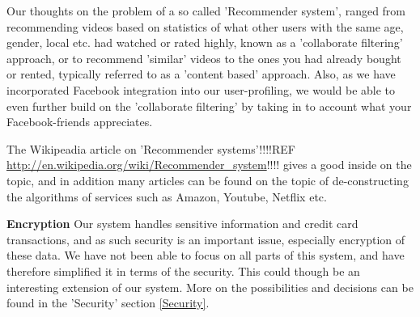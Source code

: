 Our thoughts on the problem of a so called 'Recommender system', ranged from recommending videos based on statistics of what other users with the same age, gender, local etc. had watched or rated highly, known as a 'collaborate filtering' approach, or to recommend 'similar' videos to the ones you had already bought or rented, typically referred to as a 'content based' approach. Also, as we have incorporated Facebook integration into our user-profiling, we would be able to even further build on the 'collaborate filtering' by taking in to account what your Facebook-friends appreciates. \

The Wikipeadia article on 'Recommender systems'!!!!REF \url{http://en.wikipedia.org/wiki/Recommender_system}!!!! gives a good inside on the topic, and in addition many articles can be found on the topic of de-constructing the algorithms of services such as Amazon, Youtube, Netflix etc. \

\textbf{Encryption}
Our system handles sensitive information and credit card transactions, and as such security is an important issue, especially encryption of these data. We have not been able to focus on all parts of this system, and have therefore simplified it in terms of the security. This could though be an interesting extension of our system. More on the possibilities and decisions can be found in the 'Security' section \ref{Security}. \





 